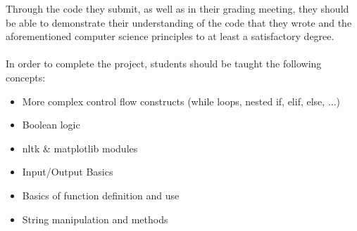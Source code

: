 \documentclass[11pt, letterpaper, onecolumn, oneside, final]{article}
\begin{document}
Through the code they submit, as well as in their grading meeting, they should be able to demonstrate their understanding of the code that they wrote and the aforementioned computer science principles to at least a satisfactory degree.\\
\\
In order to complete the project, students should be taught the following concepts:
\begin{itemize}
    \item More complex control flow constructs (while loops, nested if, elif, else, $\dots$)
    \item Boolean logic
    \item {\consolas nltk} \& {\consolas matplotlib} modules
    \item Input/Output Basics
    \item Basics of function definition and use
    \item String manipulation and methods
\end{itemize}
\end{document}
